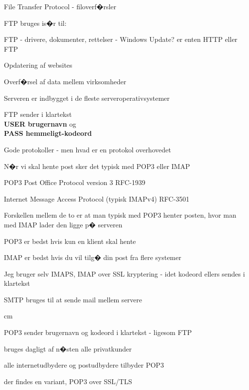 \documentclass[20pt,landscape,a4paper,footrule]{foils}
\begin{document}
\begin{list1}
\item File Transfer Protocol - filoverf�rsler
\item FTP bruges is�r til:
  \begin{list2}
    \item FTP - drivere, dokumenter, rettelser - Windows Update? er
    enten HTTP eller FTP
\item Opdatering af websites
\item Overf�rsel af data mellem virksomheder
\item Serveren er indbygget i de fleste serveroperativsystemer
  \end{list2}
\item FTP sender i klartekst\\
{\bfseries USER brugernavn} og \\
{\bfseries PASS hemmeligt-kodeord}
\end{list1}

\vskip 2cm
\centerline{Gode protokoller - men hvad er en protokol overhovedet}



\begin{list1}
\item N�r vi skal hente post sker det typisk med POP3 eller IMAP
\begin{list2}
\item POP3 Post Office Protocol version 3 RFC-1939
\item Internet Message Access Protocol (typisk IMAPv4) RFC-3501
\end{list2}
\item Forskellen mellem de to er at man typisk med POP3 henter posten, hvor man med IMAP lader den ligge p� serveren
\item POP3 er bedst hvis kun en klient skal hente
\item IMAP er bedst hvis du vil tilg� din post fra flere systemer
\item Jeg bruger selv IMAPS, IMAP over SSL kryptering - idet kodeord ellers sendes i klartekst
\item SMTP bruges til at sende mail mellem servere
\end{list1}


 cm

\begin{list1}
\item POP3 sender brugernavn og kodeord i klartekst - ligesom FTP
\item bruges dagligt af n�sten alle privatkunder
\item  alle internetudbydere og postudbydere tilbyder POP3
\item der findes en variant, POP3 over SSL/TLS
\end{list1}
\end{document}
